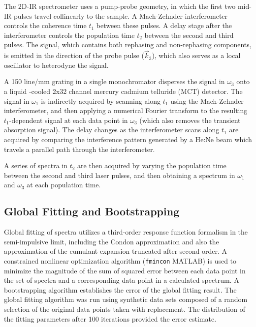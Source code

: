 {The 2D-IR spectrometer uses a pump-probe geometry,\cite{Helbing2010} in which the first two mid-IR pulses travel collinearly to the sample. A Mach-Zehnder interferometer controls the coherence time $t_1$ between these pulses. A delay stage after the interferometer controls the population time $t_2$ between the second and third pulses. The signal, which contains both rephasing and non-rephasing components, is emitted in the direction of the probe pulse ($\vec{k}_3$), which also serves as a local oscillator to heterodyne the signal.

A 150 line/mm grating in a single monochromator disperses the signal in ${\omega}_3$ onto a liquid -cooled 2x32 channel mercury cadmium telluride (MCT) detector. The signal in $\omega_1$ is indirectly acquired by scanning along $t_1$ using the Mach-Zehnder interferometer, and then applying a numerical Fourier transform to the resulting $t_1$-dependent signal at each data point in $\omega_3$ (which also removes the transient absorption signal). The delay changes as the interferometer scans along $t_1$ are acquired by comparing the interference pattern generated by a He:Ne beam which travels a parallel path through the interferometer.

A series of spectra in $t_2$ are then acquired by varying the population time between the second and third laser pulses, and then obtaining a spectrum in $\omega_1$ and $\omega_3$ at each population time.

\subsection{Global Fitting and Bootstrapping}

Global fitting of spectra utilizes a third-order response function formalism in the semi-impulsive limit, including the Condon approximation and also the approximation of the cumulant expansion truncated after second order. A constrained nonlinear optimization algorithm (\verb!fmincon! MATLAB) is used to minimize the magnitude of the sum of squared error between each data point in the set of spectra and a corresponding data point in a calculated spectrum. A bootstrapping algorithm \cite{numericalrecipes-92} establishes the error of the global fitting result. The global fitting algorithm was run using synthetic data sets composed of a random selection of the original data points taken with replacement. The distribution of the fitting parameters after 100 iterations provided the error estimate. 

}
